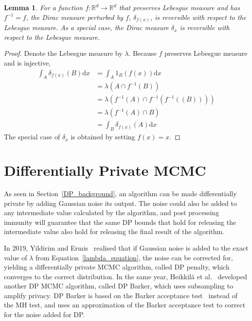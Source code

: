 \documentclass[english,twoside,openright]{HYgraduMLDS}
\newtheorem{lemma}{Lemma}
\newcommand{\R}{\mathbb{R}}
\newcommand{\dx}{\mathrm{d}}
\begin{document}
\begin{lemma}\label{dirac_measure_reversible_lemma}
  For a function \(f\colon \R^{d}\to \R^{d}\) that preserves Lebesgue measure and has
  \(f^{-1} = f\),
	the Dirac measure perturbed by \(f\), \(\delta_{f(x)}\), is reversible
  with respect to the Lebesgue measure. As a special case,
  the Dirac measure \(\delta_{x}\) is reversible with respect to the
  Lebesgue measure.
\end{lemma}
\begin{proof}
  Denote the Lebesgue measure by \(\lambda\). Because \(f\) preserves
  Lebesgue measure and is injective,
	\begin{align*}
    \int_{A}\delta_{f(x)}(B)\dx x
    &= \int_{A}1_{B}(f(x))\dx x
    \\&= \lambda(A\cap f^{-1}(B))
    \\&= \lambda(f^{-1}(A)\cap f^{-1}(f^{-1}((B))))
    \\&= \lambda(f^{-1}(A)\cap B)
    \\&= \int_{B}\delta_{f(x)}(A)\dx x
  \end{align*}
  The special case of \(\delta_{x}\) is obtained by setting \(f(x) = x\).
\end{proof}

\chapter{Differentially Private MCMC}\label{dp_mcmc_chapter}

As seen in Section~\ref{DP_background}, an algorithm can be made differentially 
private by adding Gaussian noise its output. The noise could also be added
to any intermediate value calculated by the algorithm, and post processing immunity 
will guarantee that the same DP bounds that hold for releasing the intermediate 
value also hold for releasing the final result of the algorithm.

In 2019, Yildirim and Ermis~\cite{YildirimE19} realised that if Gaussian noise
is added to the exact value of \(\lambda\) from Equation~\ref{lambda_equation},
the noise can be corrected for,
yielding a differentially private MCMC algorithm, called DP penalty,
which converges to 
the correct distribution. In the same year, Heikkilä et al.~\cite{HeikkilaJDH19}
developed another DP MCMC algorithm, called DP Barker, which uses subsampling 
to amplify privacy. DP Barker is based on the Barker acceptance
test~\cite{Barker65} instead of the MH test, and uses an approximation
of the Barker acceptance test to correct for the noise added for DP.
\end{document}
